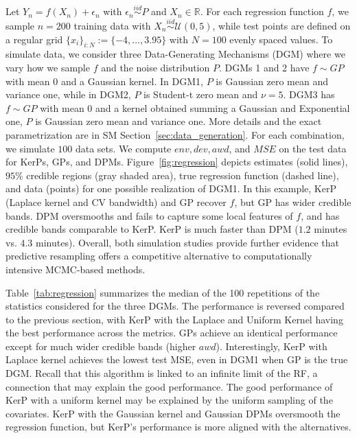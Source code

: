 \documentclass{article}
\theoremstyle{definition}
\newcommand{\iidsim}{\overset{iid}{\sim}} %
\renewcommand{\&}{and}
\begin{document}
Let $Y_n = f(X_n) +\epsilon_n$ with $\epsilon_n\iidsim P$ and $X_n\in \mathbb{R}$. For each regression function $f$, we sample $n=200$ training data with $X_n \iidsim \mathcal{U}(0,5)$, while test points are defined on a regular grid $\{x_i\}_{i:N}:=\{-4,\ldots, 3.95\}$ with $N=100$ evenly spaced values. To simulate data, we consider three Data-Generating Mechanisms (DGM) where we vary how we sample $f$ and the noise distribution $P$.  DGMs 1 and 2 have $f\sim GP$ with mean 0 and a Gaussian kernel. In DGM1, $P$ is Gaussian zero mean and variance one, while in DGM2, $P$ is Student-t zero mean and $\nu=5$. DGM3 has $f\sim GP$ with mean 0 and a kernel obtained summing a Gaussian and Exponential one, $P$ is Gaussian zero mean and variance one. More details and the exact parametrization are in SM Section~\ref{sec:data_generation}. For each combination, we simulate $100$ data sets. We compute $env,dev,awd$, and $MSE$ on the test data for KerPs, GPs, and DPMs. Figure~\ref{fig:regression} depicts estimates (solid lines), $95\%$ credible regions (gray shaded area), true regression function (dashed line), and data (points) for one possible realization of DGM1. In this example, KerP (Laplace kernel and CV bandwidth) and GP recover $f$, but GP has wider credible bands. DPM oversmooths and fails to capture some local features of $f$, and has credible bands comparable to KerP. KerP is much faster than DPM ($1.2$ minutes vs. $4.3$ minutes). Overall, both simulation studies provide further evidence that predictive resampling offers a competitive alternative to computationally intensive MCMC-based methods.

Table~\ref{tab:regression} summarizes the median of the 100 repetitions of the statistics considered for the three DGMs. The performance is reversed compared to the previous section, with KerP with the Laplace and Uniform Kernel having the best performance across the metrics. GPs achieve an identical performance except for much wider credible bands (higher $awd$). %
Interestingly, KerP with Laplace kernel achieves the lowest test MSE, even in DGM1 when GP is the true DGM. Recall that this algorithm is linked to an infinite limit of the RF, a connection that may explain the good performance. The good performance of KerP with a uniform kernel may be explained by the uniform sampling of the covariates. KerP with the Gaussian kernel and Gaussian DPMs oversmooth the regression function, but KerP's performance is more aligned with the alternatives. %
\end{document}
